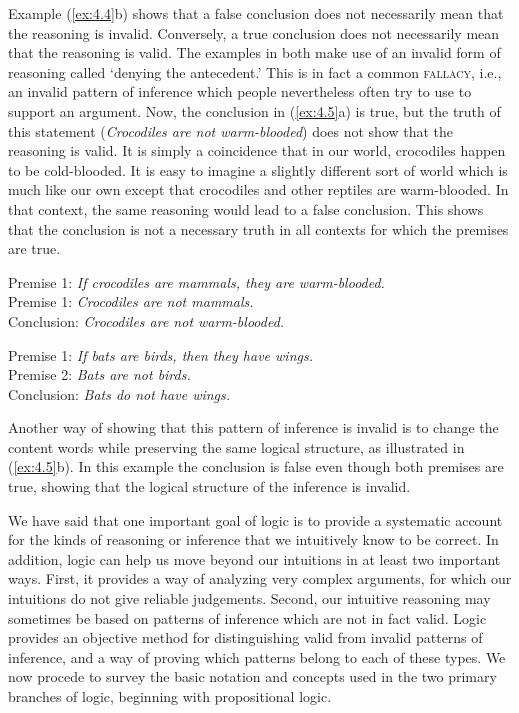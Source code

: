 Example (\ref{ex:4.4}b) shows that a false conclusion does not necessarily mean that the reasoning is invalid. Conversely, a true conclusion does not necessarily mean that the reasoning is valid. The examples in  both make use of an invalid form of reasoning called ‘denying the antecedent.’ This is in fact a common \textsc{fallacy}, i.e., an invalid pattern of inference which people nevertheless often try to use to support an argument. Now, the conclusion in (\ref{ex:4.5}a) is true, but the truth of this statement (\textit{Crocodiles are not warm-blooded}) does not show that the reasoning is valid. It is simply a coincidence that in our world, crocodiles happen to be cold-blooded. It is easy to imagine a slightly different sort of world which is much like our own except that crocodiles and other reptiles are warm-blooded. In that context, the same reasoning would lead to a false conclusion. This shows that the conclusion is not a necessary truth in all contexts for which the premises are true.


\ea \label{ex:4.5}
\ea  Premise 1: \textit{If crocodiles are mammals, they are warm-blooded.}\\
Premise 1: \textit{Crocodiles are not mammals.}\\
\FelixHRule
Conclusion: \textit{Crocodiles are not warm-blooded.}
\bigskip 

\ex  Premise 1: \textit{If bats are birds, then they have wings.}\\
Premise 2: \textit{Bats are not birds.}\\
\FelixHRule
Conclusion: \textit{Bats do not have wings.}
\z \z


Another way of showing that this pattern of inference is invalid is to change the content words while preserving the same logical structure, as illustrated in (\ref{ex:4.5}b). In this example the conclusion is false even though both premises are true, showing that the logical structure of the inference is invalid.



We have said that one important goal of logic is to provide a systematic account for the kinds of reasoning or inference that we intuitively know to be correct. In addition, logic can help us move beyond our intuitions in at least two important ways. First, it provides a way of analyzing very complex arguments, for which our intuitions do not give reliable judgements. Second, our intuitive reasoning may sometimes be based on patterns of inference which are not in fact valid. Logic provides an objective method for distinguishing valid from invalid patterns of inference, and a way of proving which patterns belong to each of these types. We now procede to survey the basic notation and concepts used in the two primary branches of logic, beginning with propositional logic.


